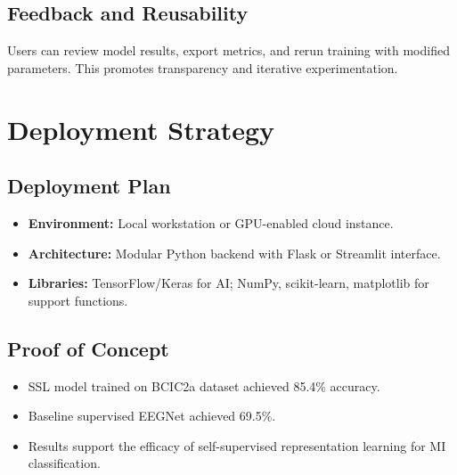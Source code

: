 \subsection*{Feedback and Reusability}
Users can review model results, export metrics, and rerun training with modified parameters. This promotes transparency and iterative experimentation.

\section{Deployment Strategy}
\label{sec:deployment}

\subsection{Deployment Plan}
\begin{itemize}
    \item \textbf{Environment:} Local workstation or GPU-enabled cloud instance.
    \item \textbf{Architecture:} Modular Python backend with Flask or Streamlit interface.
    \item \textbf{Libraries:} TensorFlow/Keras for AI; NumPy, scikit-learn, matplotlib for support functions.
\end{itemize}

\subsection{Proof of Concept}
\begin{itemize}
    \item SSL model trained on BCIC2a dataset achieved 85.4\% accuracy.
    \item Baseline supervised EEGNet achieved 69.5\%.
    \item Results support the efficacy of self-supervised representation learning for MI classification.
\end{itemize}
